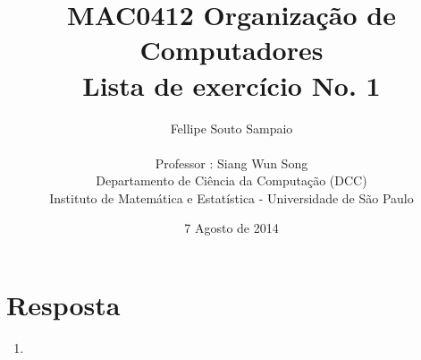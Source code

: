 \documentclass[a4paper]{article}
\title{MAC0412 Organização de Computadores \\Lista de exercício No. 1}
\author{
		Fellipe Souto Sampaio \\\\
        Professor : Siang Wun Song\\
        Departamento de Ciência da Computação (DCC) \\
        Instituto de Matemática e Estatística - Universidade de São Paulo
    	}
\date{7 Agosto de 2014}
\begin{document}
\maketitle
\newpage
\section*{Resposta}
\begin{enumerate}
\item{}
\end{enumerate}
\end{document}
